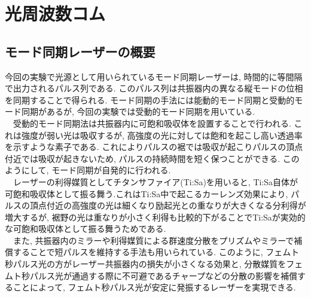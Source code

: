 \documentclass[uplatex, dvipdfmx, a4paper, report, papersize, 11pt]{jsbook}
\begin{document}
\newpage
\section{光周波数コム}
\subsection{モード同期レーザーの概要}
今回の実験で光源として用いられているモード同期レーザーは, 時間的に等間隔で出力されるパルス列である. このパルス列は共振器内の異なる縦モードの位相を同期することで得られる. モード同期の手法には能動的モード同期と受動的モード同期があるが, 今回の実験では受動的モード同期を用いている.\\
　受動的モード同期法は共振器内に可飽和吸収体を設置することで行われる. これは強度が弱い光は吸収するが, 高強度の光に対しては飽和を起こし高い透過率を示すような素子である. これによりパルスの裾では吸収が起こりパルスの頂点付近では吸収が起きないため, パルスの持続時間を短く保つことができる. このようにして, モード同期が自発的に行われる.\\
　レーザーの利得媒質としてチタンサファイア(Ti:Sa)を用いると, Ti:Sa自体が可飽和吸収体として振る舞う.これはTi:Sa中で起こるカーレンズ効果により, パルスの頂点付近の高強度の光は細くなり励起光との重なりが大きくなる分利得が増大するが, 裾野の光は重なりが小さく利得も比較的下がることでTi:Saが実効的な可飽和吸収体として振る舞うためである.\\
　また, 共振器内のミラーや利得媒質による群速度分散をプリズムやミラーで補償することで短パルスを維持する手法も用いられている. このように, フェムト秒パルス光の方がレーザー共振器内の損失が小さくなる効果と, 分散媒質をフェムト秒パルス光が通過する際に不可避であるチャープなどの分散の影響を補償することによって, フェムト秒パルス光が安定に発振するレーザーを実現できる.
\end{document}
